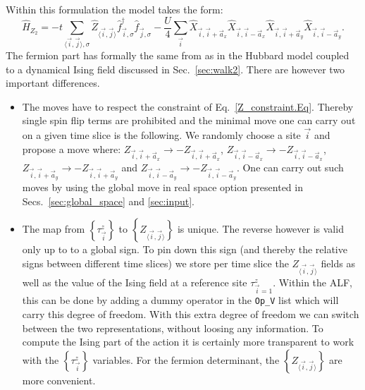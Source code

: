  
 Within this formulation  the model  takes  the form: 
 \begin{equation}
 	 \hat{H}_{Z_2}= -t \sum_{\langle \vec{i}, \vec{j} \rangle, \sigma }  \hat{Z}_{\langle \vec{i}, \vec{j} \rangle } \hat{f}^{\dagger}_{\vec{i},\sigma} \hat{f}^{\phantom{\dagger}}_{\vec{j},\sigma}   -  \frac{U}{4}  \sum_{\vec{i}}  \hat{X}_{\vec{i},\vec{i} +  \vec{a}_x} \hat{X}_{\vec{i},\vec{i} -  \vec{a}_x} \hat{X}_{\vec{i},\vec{i} +  \vec{a}_y} \hat{X}_{\vec{i},\vec{i} -  \vec{a}_y}.
 \end{equation}
The fermion part has formally the same from  as in the Hubbard model coupled to  a dynamical Ising field  discussed in Sec.~\ref{sec:walk2}.   There are however two important differences.
\begin{itemize}
\item The moves have to respect the constraint of Eq.~\ref{Z_constraint.Eq}. Thereby single spin flip terms are prohibited and the minimal move one can carry out on  a given time slice is the following. We randomly choose a site $\vec{i} $ and  propose a move where: 
$ Z_{\vec{i},\vec{i} +  \vec{a}_x} \rightarrow - Z_{\vec{i},\vec{i} +  \vec{a}_x} $,  $ Z_{\vec{i},\vec{i} -  \vec{a}_x} \rightarrow - Z_{\vec{i},\vec{i} -  \vec{a}_x} $,
$ Z_{\vec{i},\vec{i} +  \vec{a}_y} \rightarrow - Z_{\vec{i},\vec{i} +  \vec{a}_y} $ and $ Z_{\vec{i},\vec{i} -  \vec{a}_y} \rightarrow - Z_{\vec{i},\vec{i} -  \vec{a}_y} $.  One can carry out such moves by using the global move in real space option presented in Secs.~\ref{sec:global_space} and \ref{sec:input}.
\item The map from  $ \left\{ \tau^{z}_{\vec{i}}  \right\} $ to $ \left\{ Z_{\langle \vec{i}, \vec{j} \rangle } \right\} $  is unique.  The reverse however  is valid only up to  to a global sign.  To pin down this sign  (and thereby   the  relative signs between different time slices)  we  store per time slice the $  Z_{\langle \vec{i},\vec{j} \rangle } $ fields as well as the value of the Ising field  at  a reference site $\tau^{z}_{\vec{i} = 1} $. Within the ALF, this can be done by adding a dummy operator in the \texttt{Op\_V}  list which will carry this degree of freedom.    With this extra degree of freedom we can switch  between the two representations, without loosing any information.   To compute the Ising part of the action it is certainly more transparent to work  with the $ \left\{ \tau^{z}_{\vec{i}}  \right\} $  variables. For the  fermion determinant,  the $ \left\{ Z_{\langle \vec{i}, \vec{j} \rangle } \right\} $   are more convenient. 
 \end{itemize}
 

